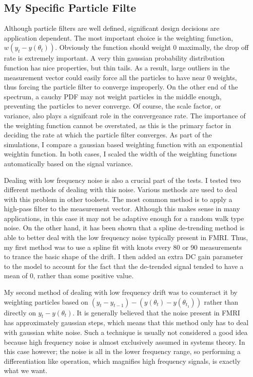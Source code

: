 \documentclass{article}
\begin{document}
\subsection*{My Specific Particle Filte}
Although particle filters are well defined, significant design decisions
are application dependent. The most important choice is the weighting function,
$w(y_t - y(\theta_t))$. Obviously the function should weight $0$ maximally,
the drop off rate is extremely important. A very thin gaussian probability 
distribution function has nice properties, but thin tails. As a result, large
outliers in the measurement vector could easily force all the particles to
have near 0 weights, thus forcing the particle filter to converge improperly. 
On the other end of the spectrum, a cauchy PDF may not
weight particles in the middle enough, preventing the particles to never 
converge. Of course, the scale factor, or variance, also plays a signifcant
role in the convergeance rate. The importance of the weighting function
cannot be overstated, as this is the primary factor in deciding the rate at
which the particle filter converges. As part of the simulations, I compare
a gaussian based weighting function with an exponential weightin function.
In both cases, I scaled the width of the weighting functions automatically based
on the signal variance.

Dealing with low frequency noise is also a crucial part of the tests. 
I tested two different methods of dealing with this noise. Various methods
are used to deal with this problem in other toolsets. The most common method
is to apply a high-pass filter to the measurement vector. Although this makes
sense in many applications, in this case it may not be adaptive enough for
a random walk type noise. On the other hand, it has been shown that a spline
de-trending method is able to better deal with the low frequency noise
typically present in FMRI. Thus, my first method
was to use a spline fit with knots every 80 or 90 measurements to trance
the basic shape of the drift. I then added an extra DC gain parameter to
the model to account for the fact that the de-trended signal tended to have 
a mean of 0, rather than some positive value. 

My second method of dealing with low frequency drift was to counteract
it by weighting particles based on $(y_t-y_{t-1}) - (y(\theta_t)-y(\theta_{t_1}))$ 
rather than directly on $y_t - y(\theta_t)$. It is generally believed that the noise present in 
FMRI has approximately gaussian steps, which means that this method only
has to deal with gaussian white noise. Such a technique is usually not considered a
good idea because high frequency noise is almost exclusively assumed in
systems theory. In this case however; the noise is all in the lower frequency
range, so performing a differentiation like operation, which magnifies high
frequency signals, is exactly what we want. 
\end{document}
